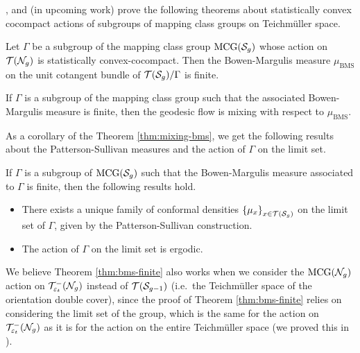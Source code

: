 \textcite{gekhtman2023dynamics}, and \textcite{CGTY} (in upcoming work) prove the following theorems about statistically convex cocompact actions of subgroups of mapping class groups on Teichmüller space.

\begin{theorem}
  \label{thm:bms-finite}
  Let $\Gamma$ be a subgroup of the mapping class group $\mathrm{MCG}(\mathcal{S}_g)$ whose action on $\mathcal{T}(\mathcal{N}_g)$ is statistically convex-cocompact.
  Then the Bowen-Margulis measure $\mu_{\mathrm{BMS}}$ on the unit cotangent bundle of $\mathcal{T}(\mathcal{S}_g)/\Gamma$ is finite.
\end{theorem}

\begin{theorem}
  \label{thm:mixing-bms}
  If $\Gamma$ is a subgroup of the mapping class group such that the associated Bowen-Margulis measure is finite, then the geodesic flow is mixing with respect to $\mu_{\mathrm{BMS}}$.
\end{theorem}

As a corollary of the Theorem \ref{thm:mixing-bms}, we get the following results about the Patterson-Sullivan measures and the action of $\Gamma$ on the limit set.
\begin{corollary}
  \label{cor:niceness}
  If $\Gamma$ is a subgroup of $\mathrm{MCG}(\mathcal{S}_g)$ such that the Bowen-Margulis measure associated to $\Gamma$ is finite, then the following results hold.
  \begin{itemize}
  \item There exists a unique family of conformal densities $\left\{ \mu_x \right\}_{x \in \mathcal{T}(\mathcal{S}_g)}$ on the limit set of $\Gamma$, given by the Patterson-Sullivan construction.
  \item The action of $\Gamma$ on the limit set is ergodic.
  \end{itemize}
\end{corollary}

We believe Theorem \ref{thm:bms-finite} also works when we consider the $\mathrm{MCG}(\mathcal{N}_g)$ action on $\mathcal{T}_{\varepsilon_t}^{-}(\mathcal{N}_g)$ instead of $\mathcal{T}(\mathcal{S}_{g-1})$ (i.e.\ the Teichmüller space of the orientation double cover), since the proof of Theorem \ref{thm:bms-finite} relies on considering the limit set of the group, which is the same for the action on $\mathcal{T}_{\varepsilon_t}^{-}(\mathcal{N}_g)$ as it is for the action on the entire Teichmüller space (we proved this in \cite[Theorem 4.2]{limitsetkhan}).

